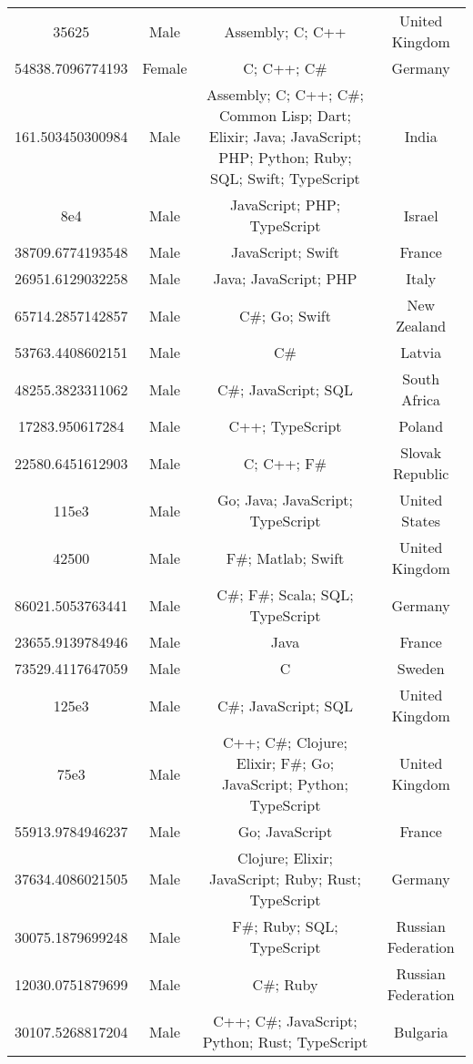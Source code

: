 \begin{center}
\begin{tabular}{ |c|c|c|c| }
35625  &  Male  &  Assembly; C; C++  &  United Kingdom  \\ 
54838.7096774193  &  Female  &  C; C++; C\#  &  Germany  \\ 
161.503450300984  &  Male  &  Assembly; C; C++; C\#; Common Lisp; Dart; Elixir; Java; JavaScript; PHP; Python; Ruby; SQL; Swift; TypeScript  &  India  \\ 
8e4  &  Male  &  JavaScript; PHP; TypeScript  &  Israel  \\ 
38709.6774193548  &  Male  &  JavaScript; Swift  &  France  \\ 
26951.6129032258  &  Male  &  Java; JavaScript; PHP  &  Italy  \\ 
65714.2857142857  &  Male  &  C\#; Go; Swift  &  New Zealand  \\ 
53763.4408602151  &  Male  &  C\#  &  Latvia  \\ 
48255.3823311062  &  Male  &  C\#; JavaScript; SQL  &  South Africa  \\ 
17283.950617284  &  Male  &  C++; TypeScript  &  Poland  \\ 
22580.6451612903  &  Male  &  C; C++; F\#  &  Slovak Republic  \\ 
115e3  &  Male  &  Go; Java; JavaScript; TypeScript  &  United States  \\ 
42500  &  Male  &  F\#; Matlab; Swift  &  United Kingdom  \\ 
86021.5053763441  &  Male  &  C\#; F\#; Scala; SQL; TypeScript  &  Germany  \\ 
23655.9139784946  &  Male  &  Java  &  France  \\ 
73529.4117647059  &  Male  &  C  &  Sweden  \\ 
125e3  &  Male  &  C\#; JavaScript; SQL  &  United Kingdom  \\ 
75e3  &  Male  &  C++; C\#; Clojure; Elixir; F\#; Go; JavaScript; Python; TypeScript  &  United Kingdom  \\ 
55913.9784946237  &  Male  &  Go; JavaScript  &  France  \\ 
37634.4086021505  &  Male  &  Clojure; Elixir; JavaScript; Ruby; Rust; TypeScript  &  Germany  \\ 
30075.1879699248  &  Male  &  F\#; Ruby; SQL; TypeScript  &  Russian Federation  \\ 
12030.0751879699  &  Male  &  C\#; Ruby  &  Russian Federation  \\ 
30107.5268817204  &  Male  &  C++; C\#; JavaScript; Python; Rust; TypeScript  &  Bulgaria  \\ 

\end{tabular}
\end{center}
